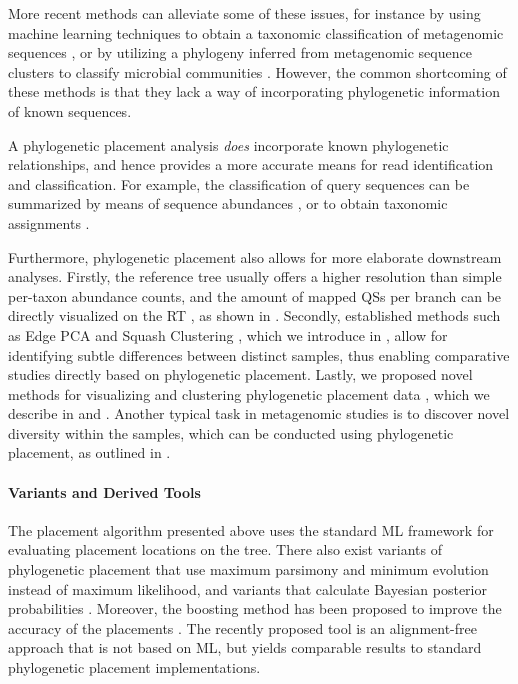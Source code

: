 More recent methods can alleviate some of these issues, for instance by
using machine learning techniques to obtain a taxonomic classification of metagenomic sequences \cite{Vervier2015},
or by utilizing a phylogeny inferred from metagenomic sequence clusters to classify microbial communities \cite{Tanaseichuk2014}.
However, the common shortcoming of these methods is
that they lack a way of incorporating phylogenetic information of known sequences.

A phylogenetic placement analysis \emph{does} incorporate known phylogenetic relationships,
and hence provides a more accurate means for read identification and classification.
For example, the classification of query sequences
can be summarized by means of sequence abundances \cite{Pace1997,Hugenholtz1998},
or to obtain taxonomic assignments \cite{Kozlov2016}.

Furthermore, phylogenetic placement also allows for more elaborate downstream analyses.
Firstly, the reference tree usually offers a higher resolution than simple per-taxon abundance counts,
and the amount of mapped \acp{QS} per branch can be directly visualized on the \ac{RT} \citep{Mahe2017},
as shown in .
Secondly, established methods such as Edge PCA and Squash Clustering \citep{Matsen2011a},
which we introduce in ,
allow for identifying subtle differences between distinct samples,
thus enabling comparative studies directly based on phylogenetic placement.
Lastly, we proposed novel methods for visualizing and clustering phylogenetic placement data \citep{Czech2018a},
which we describe in  and .
Another typical task in metagenomic studies is to discover novel diversity within the samples,
which can be conducted using phylogenetic placement, as outlined in .

\paragraph{Variants and Derived Tools}
\label{ch:Foundations:sec:PhylogeneticPlacement:sub:UseCasesApplications:par:DerivedTools}

The placement algorithm presented above uses the standard ML framework for evaluating placement locations on the tree.
There also exist variants of phylogenetic placement that use maximum parsimony \cite{Berger2011}
and minimum evolution \cite{Filipski2015} instead of maximum likelihood,
and variants that calculate Bayesian posterior probabilities \cite{Matsen2010}.
Moreover, the boosting method  has been proposed to improve the accuracy of the placements \cite{Mirarab2012}.
The recently proposed tool  \cite{Linard2018} is an alignment-free approach
that is not based on ML, but yields comparable results to standard phylogenetic placement implementations.

